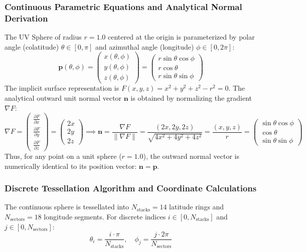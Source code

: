 \documentclass[11pt,a4paper]{article}
\begin{document}
\subsubsection{Continuous Parametric Equations and Analytical Normal Derivation}
The UV Sphere of radius $r = 1.0$ centered at the origin is parameterized by polar angle (colatitude) $\theta \in [0, \pi]$ and azimuthal angle (longitude) $\phi \in [0, 2\pi]$:
\begin{equation}
    \mathbf{p}(\theta, \phi) = \begin{pmatrix} x(\theta, \phi) \\ y(\theta, \phi) \\ z(\theta, \phi) \end{pmatrix} = \begin{pmatrix} r \sin\theta \cos\phi \\ r \cos\theta \\ r \sin\theta \sin\phi \end{pmatrix}
\end{equation}
The implicit surface representation is $F(x, y, z) = x^2 + y^2 + z^2 - r^2 = 0$. The analytical outward unit normal vector $\mathbf{n}$ is obtained by normalizing the gradient $\nabla F$:
\begin{equation}
    \nabla F = \begin{pmatrix} \frac{\partial F}{\partial x} \\ \frac{\partial F}{\partial y} \\ \frac{\partial F}{\partial z} \end{pmatrix} = \begin{pmatrix} 2x \\ 2y \\ 2z \end{pmatrix} \implies \mathbf{n} = \frac{\nabla F}{\|\nabla F\|} = \frac{(2x, 2y, 2z)}{\sqrt{4x^2 + 4y^2 + 4z^2}} = \frac{(x, y, z)}{r} = \begin{pmatrix} \sin\theta \cos\phi \\ \cos\theta \\ \sin\theta \sin\phi \end{pmatrix}
\end{equation}
Thus, for any point on a unit sphere ($r=1.0$), the outward normal vector is numerically identical to its position vector: $\mathbf{n} = \mathbf{p}$.

\subsubsection{Discrete Tessellation Algorithm and Coordinate Calculations}
The continuous sphere is tessellated into $N_{\text{stacks}} = 14$ latitude rings and $N_{\text{sectors}} = 18$ longitude segments. For discrete indices $i \in [0, N_{\text{stacks}}]$ and $j \in [0, N_{\text{sectors}}]$:
\begin{equation}
    \theta_i = \frac{i \cdot \pi}{N_{\text{stacks}}}, \quad \phi_j = \frac{j \cdot 2\pi}{N_{\text{sectors}}}
\end{equation}
\end{document}
